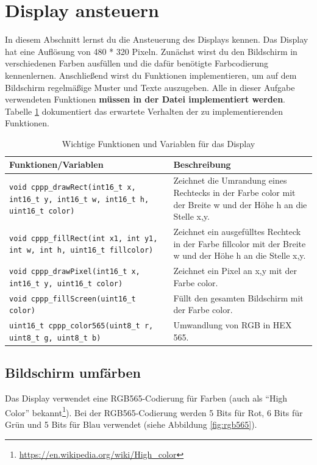 \section{\ExercisePrefixEmbeddedC Display ansteuern \optional}

\optionaltextbox

In diesem Abschnitt lernst du die Ansteuerung des Displays kennen.
Das Display hat eine Auflösung von 480 * 320 Pixeln.
Zunächst wirst du den Bildschirm in verschiedenen Farben ausfüllen und die dafür benötigte Farbcodierung kennenlernen.
Anschließend wirst du Funktionen implementieren, um auf dem Bildschirm regelmäßige Muster und Texte auszugeben.
Alle in dieser Aufgabe verwendeten Funktionen \textbf{müssen in der Datei  implementiert werden}. 
Tabelle \ref{tab:displayFunctions} dokumentiert das erwartete Verhalten der zu implementierenden Funktionen.
%
\begin{table}[b]
	\centering
	\caption{Wichtige Funktionen und Variablen für das Display}
	\label{tab:displayFunctions}
	\begin{tabular}{p{7cm}p{7cm}}
        \toprule
		\textbf{Funktionen/Variablen} & \textbf{Beschreibung} \\
        \midrule
        \lstinline|void cppp_drawRect(int16_t x, int16_t y, int16_t w, int16_t h, uint16_t color)|
        & Zeichnet die Umrandung eines Rechtecks in der Farbe color mit der Breite w und der Höhe h an die Stelle x,y. \\ \hline
		\lstinline|void cppp_fillRect(int x1, int y1, int w, int h, uint16_t fillcolor)|
        & Zeichnet ein ausgefülltes Rechteck in der Farbe fillcolor mit der Breite w und der Höhe h an die Stelle x,y. \\ \hline
		\lstinline|void cppp_drawPixel(int16_t x, int16_t y, uint16_t color)|
        & Zeichnet ein Pixel an x,y mit der Farbe color. \\ \hline
		\lstinline|void cppp_fillScreen(uint16_t color)| 
        & Füllt den gesamten Bildschirm mit der Farbe color. \\ \hline
		\lstinline|uint16_t cppp_color565(uint8_t r, uint8_t g, uint8_t b)|
        & Umwandlung von RGB in HEX 565. \\
        \bottomrule
	\end{tabular}
\end{table}

\subsection{Bildschirm umfärben}
Das Display verwendet eine RGB565-Codierung für Farben (auch als \enquote{High Color} bekannt\footnote{\url{https://en.wikipedia.org/wiki/High_color}}).
Bei der RGB565-Codierung werden 5 Bits für Rot, 6 Bits für Grün und 5 Bits für Blau verwendet (siehe Abbildung \ref{fig:rgb565}).

